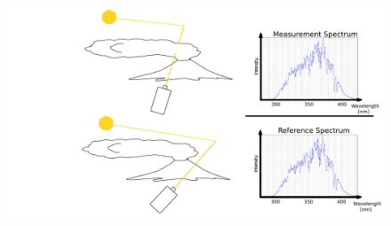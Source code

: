 \documentclass{beamer} %
\begin{document}
\begin{frame}
{			\begin{figure}
				\hspace{-3cm}
				\includegraphics[width=1.1\linewidth]{../../Bilder/Presentation1_v4_5b}
				\label{fig:Presentation1_v4_6}
			\end{figure}
		}

\end{frame}
\end{document}
